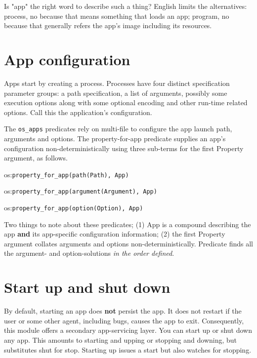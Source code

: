 Is "app" the right word to describe such a thing? English limits the
alternatives: process, no because that means something that loads an
app; program, no because that generally refers the app's image
including its resources.

\section{App configuration}

Apps start by creating a process. Processes have four distinct
specification parameter groups: a path specification, a list of
arguments, possibly some execution options along with some optional
encoding and other run-time related options. Call this the
application's configuration.

The \verb$os_apps$ predicates rely on multi-file  to
configure the app launch path, arguments and options. The
property-for-app predicate supplies an app's configuration
non-deterministically using three sub-terms for the first Property
argument, as follows.

\begin{shortlist}
    \item os:\verb$property_for_app(path(Path), App)$
    \item os:\verb$property_for_app(argument(Argument), App)$
    \item os:\verb$property_for_app(option(Option), App)$
\end{shortlist}

Two things to note about these predicates; (1) App is a compound
describing the app \textbf{and} its app-specific configuration information;
(2) the first Property argument collates arguments and options
non-deterministically. Predicate  finds all the argument-
and option-solutions \textit{in the order defined}.

\section{Start up and shut down}

By default, starting an app does \textbf{not} persist the app. It does not
restart if the user or some other agent, including bugs, causes the
app to exit. Consequently, this module offers a secondary
app-servicing layer. You can start up or shut down any app. This
amounts to starting and upping or stopping and downing, but
substitutes shut for stop. Starting up issues a start but also
watches for stopping.

